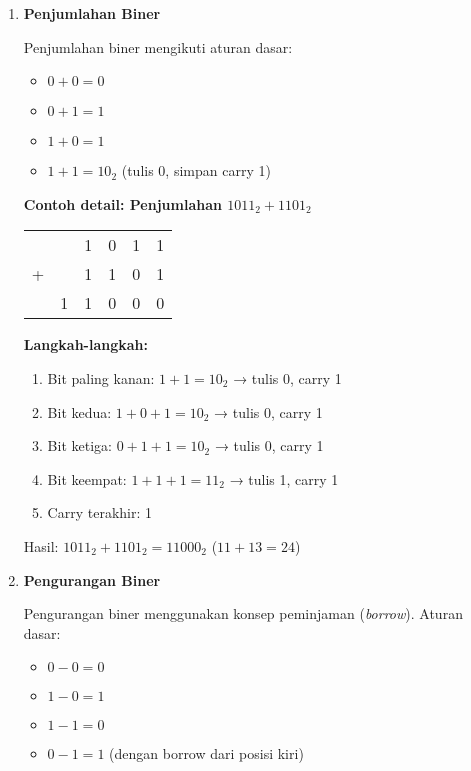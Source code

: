 \begin{enumerate}
\item \textbf{Penjumlahan Biner}

Penjumlahan biner mengikuti aturan dasar:
\begin{itemize}
    \item \(0 + 0 = 0\)
    \item \(0 + 1 = 1\)
    \item \(1 + 0 = 1\)
    \item \(1 + 1 = 10_2\) (tulis 0, simpan carry 1)
\end{itemize}

\textbf{Contoh detail: Penjumlahan \(1011_2 + 1101_2\)}

\begin{center}
\begin{tabular}{cccccc}
  &   & 1 & 0 & 1 & 1 \\
+ &   & 1 & 1 & 0 & 1 \\
\hline
  & 1 & 1 & 0 & 0 & 0 \\
\end{tabular}
\end{center}

\textbf{Langkah-langkah:}
\begin{enumerate}
    \item Bit paling kanan: \(1 + 1 = 10_2\) → tulis 0, carry 1
    \item Bit kedua: \(1 + 0 + 1 = 10_2\) → tulis 0, carry 1
    \item Bit ketiga: \(0 + 1 + 1 = 10_2\) → tulis 0, carry 1
    \item Bit keempat: \(1 + 1 + 1 = 11_2\) → tulis 1, carry 1
    \item Carry terakhir: 1
\end{enumerate}

Hasil: \(1011_2 + 1101_2 = 11000_2\) (\(11 + 13 = 24\))

\item \textbf{Pengurangan Biner}

Pengurangan biner menggunakan konsep peminjaman (\textit{borrow}). Aturan dasar:
\begin{itemize}
    \item \(0 - 0 = 0\)
    \item \(1 - 0 = 1\)
    \item \(1 - 1 = 0\)
    \item \(0 - 1 = 1\) (dengan borrow dari posisi kiri)
\end{itemize}


\end{enumerate}
